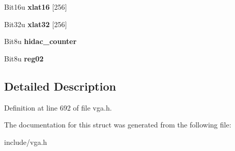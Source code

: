 \begin{DoxyCompactItemize}
\item 
\hypertarget{structVGA__Dac_a0ecbd2205771f2bd6eeda1e799f17597}{Bit16u {\bfseries xlat16} \mbox{[}256\mbox{]}}\label{structVGA__Dac_a0ecbd2205771f2bd6eeda1e799f17597}

\item 
\hypertarget{structVGA__Dac_a9bd0942c9ea49acc3d4055ffd6115901}{Bit32u {\bfseries xlat32} \mbox{[}256\mbox{]}}\label{structVGA__Dac_a9bd0942c9ea49acc3d4055ffd6115901}

\item 
\hypertarget{structVGA__Dac_acb8aaed4d1da7f09f5875bc6d4907721}{Bit8u {\bfseries hidac\-\_\-counter}}\label{structVGA__Dac_acb8aaed4d1da7f09f5875bc6d4907721}

\item 
\hypertarget{structVGA__Dac_a5d62487fbce7e19eaeb97eb8685dd301}{Bit8u {\bfseries reg02}}\label{structVGA__Dac_a5d62487fbce7e19eaeb97eb8685dd301}

\end{DoxyCompactItemize}


\subsection{Detailed Description}


Definition at line 692 of file vga.\-h.



The documentation for this struct was generated from the following file\-:\begin{DoxyCompactItemize}
\item 
include/vga.\-h\end{DoxyCompactItemize}
